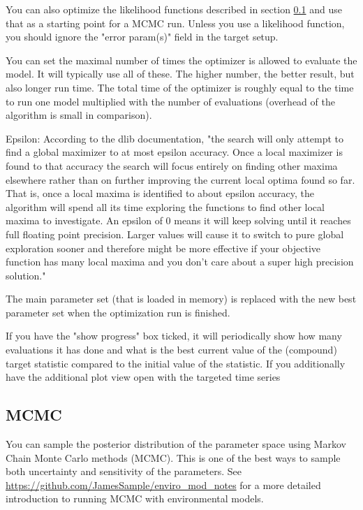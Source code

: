 \documentclass[11pt]{article}
\theoremstyle{definition}
\begin{document}
You can also optimize the likelihood functions described in section \ref{sec:mcmc} and use that as a starting point for a MCMC run. Unless you use a likelihood function, you should ignore the "error param(s)" field in the target setup.

You can set the maximal number of times the optimizer is allowed to evaluate the model. It will typically use all of these. The higher number, the better result, but also longer run time. The total time of the optimizer is roughly equal to the time to run one model multiplied with the number of evaluations (overhead of the algorithm is small in comparison).

Epsilon: According to the dlib documentation, "the search will only attempt to find a global
              maximizer to at most epsilon accuracy.  Once a local maximizer is
              found to that accuracy the search will focus entirely on finding other maxima
              elsewhere rather than on further improving the current local optima found so
              far.  That is, once a local maxima is identified to about epsilon
              accuracy, the algorithm will spend all its time exploring the functions to
              find other local maxima to investigate.  An epsilon of 0 means it will keep
              solving until it reaches full floating point precision.  Larger values will
              cause it to switch to pure global exploration sooner and therefore might be
              more effective if your objective function has many local maxima and you don't
              care about a super high precision solution."

The main parameter set (that is loaded in memory) is replaced with the new best parameter set when the optimization run is finished.

If you have the "show progress" box ticked, it will periodically show how many evaluations it has done and what is the best current value of the (compound) target statistic compared to the initial value of the statistic. If you additionally have the additional plot view open with the targeted time series

\subsection{MCMC}\label{sec:mcmc}
You can sample the posterior distribution of the parameter space using Markov Chain Monte Carlo methods (MCMC). This is one of the best ways to sample both uncertainty and sensitivity of the parameters. See \url{https://github.com/JamesSample/enviro_mod_notes} for a more detailed introduction to running MCMC with environmental models.
\end{document}
